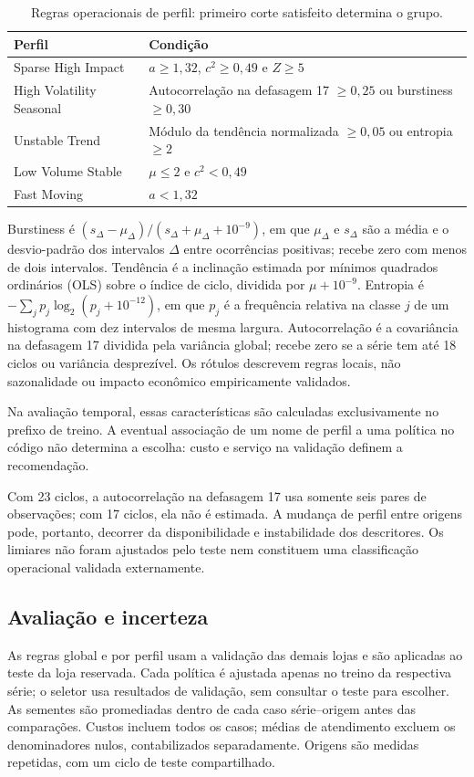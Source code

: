 \documentclass[preprint,12pt]{elsarticle}
\begin{document}
\begin{table}[htbp]\centering\small
\caption{Regras operacionais de perfil: primeiro corte satisfeito determina o grupo.}\label{tab:profile_rules}
\begin{tabular}{@{}p{3.7cm}p{7.2cm}@{}}\toprule
Perfil & Condição\\\midrule
Sparse High Impact & $a\geq1{,}32$, $c^2\geq0{,}49$ e $Z\geq5$\\
High Volatility Seasonal & Autocorrelação na defasagem 17 $\geq0{,}25$ ou burstiness $\geq0{,}30$\\
Unstable Trend & Módulo da tendência normalizada $\geq0{,}05$ ou entropia $\geq2$\\
Low Volume Stable & $\mu\leq2$ e $c^2<0{,}49$\\
Fast Moving & $a<1{,}32$\\\bottomrule\end{tabular}\end{table}

Burstiness é $(s_\Delta-\mu_\Delta)/(s_\Delta+\mu_\Delta+10^{-9})$, em que $\mu_\Delta$ e $s_\Delta$ são a média e o desvio-padrão dos intervalos $\Delta$ entre ocorrências positivas; recebe zero com menos de dois intervalos. Tendência é a inclinação estimada por mínimos quadrados ordinários (OLS) sobre o índice de ciclo, dividida por $\mu+10^{-9}$. Entropia é $-\sum_j p_j\log_2(p_j+10^{-12})$, em que $p_j$ é a frequência relativa na classe $j$ de um histograma com dez intervalos de mesma largura. Autocorrelação é a covariância na defasagem 17 dividida pela variância global; recebe zero se a série tem até 18 ciclos ou variância desprezível. Os rótulos descrevem regras locais, não sazonalidade ou impacto econômico empiricamente validados.

Na avaliação temporal, essas características são calculadas exclusivamente no prefixo de treino. A eventual associação de um nome de perfil a uma política no código não determina a escolha: custo e serviço na validação definem a recomendação.

Com 23 ciclos, a autocorrelação na defasagem 17 usa somente seis pares de observações; com 17 ciclos, ela não é estimada. A mudança de perfil entre origens pode, portanto, decorrer da disponibilidade e instabilidade dos descritores. Os limiares não foram ajustados pelo teste nem constituem uma classificação operacional validada externamente.

\subsection{Avaliação e incerteza}
As regras global e por perfil usam a validação das demais lojas e são aplicadas ao teste da loja reservada. Cada política é ajustada apenas no treino da respectiva série; o seletor usa resultados de validação, sem consultar o teste para escolher. As sementes são promediadas dentro de cada caso série--origem antes das comparações. Custos incluem todos os casos; médias de atendimento excluem os denominadores nulos, contabilizados separadamente. Origens são medidas repetidas, com um ciclo de teste compartilhado.
\end{document}
